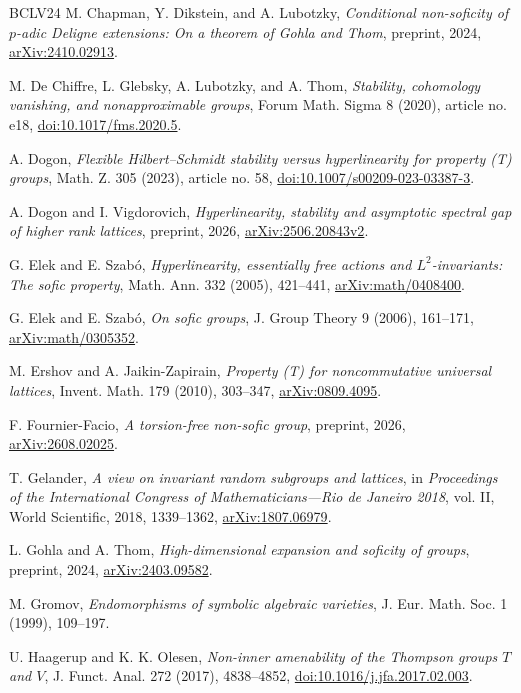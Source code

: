 \documentclass[10pt]{article}
\begin{document}
\begin{thebibliography}{BCLV24}
M. Chapman, Y. Dikstein, and A. Lubotzky, \emph{Conditional non-soficity of $p$-adic Deligne extensions: On a theorem of Gohla and Thom}, preprint, 2024, \url{arXiv:2410.02913}.

M. De Chiffre, L. Glebsky, A. Lubotzky, and A. Thom, \emph{Stability, cohomology vanishing, and nonapproximable groups}, Forum Math. Sigma 8 (2020), article no. e18, \url{doi:10.1017/fms.2020.5}.

A. Dogon, \emph{Flexible Hilbert--Schmidt stability versus hyperlinearity for property (T) groups}, Math. Z. 305 (2023), article no. 58, \url{doi:10.1007/s00209-023-03387-3}.

A. Dogon and I. Vigdorovich, \emph{Hyperlinearity, stability and asymptotic spectral gap of higher rank lattices}, preprint, 2026, \url{arXiv:2506.20843v2}.

G. Elek and E. Szabó, \emph{Hyperlinearity, essentially free actions and $L^2$-invariants: The sofic property}, Math. Ann. 332 (2005), 421--441, \url{arXiv:math/0408400}.

G. Elek and E. Szabó, \emph{On sofic groups}, J. Group Theory 9 (2006), 161--171, \url{arXiv:math/0305352}.

M. Ershov and A. Jaikin-Zapirain, \emph{Property (T) for noncommutative universal lattices}, Invent. Math. 179 (2010), 303--347, \url{arXiv:0809.4095}.

F. Fournier-Facio, \emph{A torsion-free non-sofic group}, preprint, 2026, \url{arXiv:2608.02025}.

T. Gelander, \emph{A view on invariant random subgroups and lattices}, in \emph{Proceedings of the International Congress of Mathematicians---Rio de Janeiro 2018}, vol. II, World Scientific, 2018, 1339--1362, \url{arXiv:1807.06979}.

L. Gohla and A. Thom, \emph{High-dimensional expansion and soficity of groups}, preprint, 2024, \url{arXiv:2403.09582}.

M. Gromov, \emph{Endomorphisms of symbolic algebraic varieties}, J. Eur. Math. Soc. 1 (1999), 109--197.

U. Haagerup and K. K. Olesen, \emph{Non-inner amenability of the Thompson groups $T$ and $V$}, J. Funct. Anal. 272 (2017), 4838--4852, \url{doi:10.1016/j.jfa.2017.02.003}.


\end{thebibliography}
\end{document}
